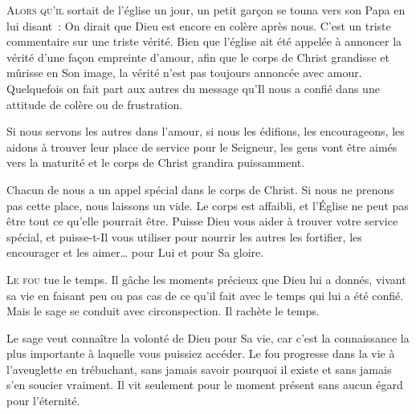 \lettrine{A}{lors qu'il} sortait de l'église un jour,
 un petit garçon se touna vers son Papa  en lui disant~: 
 \og On dirait que Dieu est encore en colère après nous. \fg{}
 C'est un triste commentaire sur une triste vérité.
 Bien que l'église ait été appelée à annoncer la vérité
 d'une façon empreinte d'amour, afin que le corps de Christ grandisse
 et mûrisse en Son image, la vérité n'est pas toujours annoncée avec amour.
 Quelquefois  on fait part aux autres du message
 qu'Il nous a confié dans une attitude de colère ou de frustration. 


Si nous servons les autres dans l'amour, si nous les édifions,
 les encourageons, les aidons à trouver leur place de service
 pour le Seigneur, les gens vont être aimés vers la maturité
 \ocadr et le corps de Christ grandira puissamment.

Chacun de nous a un appel spécial dans le corps de Christ.
 Si nous ne prenons pas cette place, nous laissons un vide.
 Le corps est affaibli, et l'Église 
 ne peut pas être tout ce qu'elle pourrait être.
 Puisse Dieu vous aider à trouver votre service spécial,
 et puisse-t-Il vous utiliser pour nourrir les autres
 \ocadr les fortifier, les encourager et les aimer\dots{}
 pour Lui et pour Sa gloire.

\dvrule






\lettrine{L}{e fou} tue le temps.
 Il gâche les moments précieux que Dieu lui a donnés,
 vivant sa vie en faisant peu ou pas cas de ce qu'il fait
 avec le temps qui lui a été confié.
 Mais le sage se conduit avec circonspection. Il rachète le temps.

Le sage veut connaître la volonté de Dieu pour Sa vie,
 car c'est la connaissance la plus importante à laquelle vous puissiez accéder.
 Le fou progresse dans la vie à l'aveuglette en trébuchant,
 sans jamais savoir pourquoi il existe et sans jamais s'en soucier vraiment.
 Il vit seulement pour le moment présent sans aucun égard pour l'éternité.

